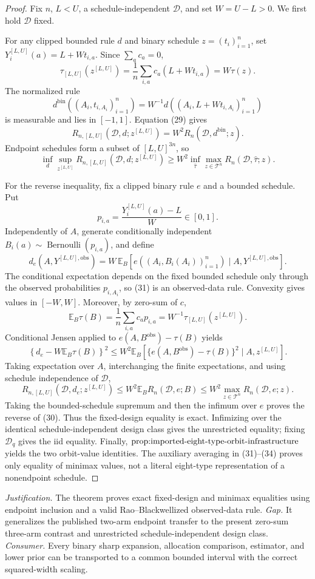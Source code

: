 \documentclass{article}
\begin{document}
\begin{proof}
Fix \(n\), \(L<U\), a schedule-independent \(\mathcal D\), and set \(W=U-L>0\).  We first hold \(\mathcal D\) fixed.

For any clipped bounded rule \(d\) and binary schedule \(z=(t_i)_{i=1}^n\), set \(Y_i^{[L,U]}(a)=L+Wt_{i,a}\).  Since \(\sum_ac_a=0\),
\[
\tau_{[L,U]}(z^{[L,U]})
=\frac1n\sum_{i,a}c_a(L+Wt_{i,a})=W\tau(z).
\tag{29}
\]
The normalized rule
\[
d^{\mathrm{bin}}((A_i,t_{i,A_i})_{i=1}^n)
=W^{-1}d((A_i,L+Wt_{i,A_i})_{i=1}^n)
\]
is measurable and lies in \([-1,1]\).  Equation (29) gives
\[
R_{n,[L,U]}(\mathcal D,d;z^{[L,U]})
=W^2R_n(\mathcal D,d^{\mathrm{bin}};z).
\]
Endpoint schedules form a subset of \([L,U]^{3n}\), so
\[
\inf_d\sup_{z^{[L,U]}}R_{n,[L,U]}(\mathcal D,d;z^{[L,U]})
\geq W^2\inf_{\widehat\tau}\max_{z\in\mathcal T^n}
R_n(\mathcal D,\widehat\tau;z).
\tag{30}
\]

For the reverse inequality, fix a clipped binary rule \(e\) and a bounded schedule.  Put
\[
p_{i,a}=\frac{Y_i^{[L,U]}(a)-L}{W}\in[0,1].
\]
Independently of \(A\), generate conditionally independent \(B_i(a)\sim\operatorname{Bernoulli}(p_{i,a})\), and define
\[
d_e(A,Y^{[L,U],\mathrm{obs}})
=W\,\mathbb E_B\left[
e((A_i,B_i(A_i))_{i=1}^n)\mid A,Y^{[L,U],\mathrm{obs}}
\right].
\tag{31}
\]
The conditional expectation depends on the fixed bounded schedule only through the observed probabilities \(p_{i,A_i}\), so (31) is an observed-data rule.  Convexity gives values in \([-W,W]\).  Moreover, by zero-sum of \(c\),
\[
\mathbb E_B\tau(B)
=\frac1n\sum_{i,a}c_ap_{i,a}
=W^{-1}\tau_{[L,U]}(z^{[L,U]}).
\tag{32}
\]
Conditional Jensen applied to \(e(A,B^{\mathrm{obs}})-\tau(B)\) yields
\[
\left\{d_e-W\mathbb E_B\tau(B)\right\}^2
\leq W^2\mathbb E_B\left[
\{e(A,B^{\mathrm{obs}})-\tau(B)\}^2\mid A,z^{[L,U]}
\right].
\tag{33}
\]
Taking expectation over \(A\), interchanging the finite expectations, and using schedule independence of \(\mathcal D\),
\[
R_{n,[L,U]}(\mathcal D,d_e;z^{[L,U]})
\leq W^2\mathbb E_BR_n(\mathcal D,e;B)
\leq W^2\max_{z\in\mathcal T^n}R_n(\mathcal D,e;z).
\tag{34}
\]
Taking the bounded-schedule supremum and then the infimum over \(e\) proves the reverse of (30).  Thus the fixed-design equality is exact.  Infimizing over the identical schedule-independent design class gives the unrestricted equality; fixing \(\mathcal D_q\) gives the iid equality.  Finally, \(\textnormal{prop:imported-eight-type-orbit-infrastructure}\) yields the two orbit-value identities.  The auxiliary averaging in (31)--(34) proves only equality of minimax values, not a literal eight-type representation of a nonendpoint schedule.
\end{proof}
\par\smallskip\noindent \textit{Justification.} The theorem proves exact fixed-design and minimax equalities using endpoint inclusion and a valid Rao--Blackwellized observed-data rule. \textit{Gap.} It generalizes the published two-arm endpoint transfer to the present zero-sum three-arm contrast and unrestricted schedule-independent design class. \textit{Consumer.} Every binary sharp expansion, allocation comparison, estimator, and lower prior can be transported to a common bounded interval with the correct squared-width scaling.
\end{document}
